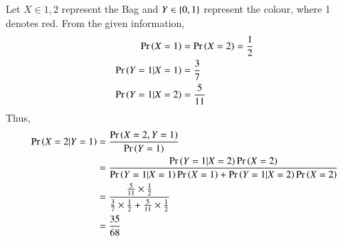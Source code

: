 Let $X \in {1,2}$ represent the Bag  and $Y \in \left\{0,1\right\}$ represent the colour, where 1 denotes red.  From the given information,
\begin{align}
\Pr\left(X=1\right)&=\Pr\left(X=2\right) = \frac{1}{2}
\\
\Pr\left(Y = 1|X=1\right) &= \frac{3}{7}
\\
\Pr\left(Y = 1|X=2\right) &= \frac{5}{11}
\end{align}
Thus,
{\tiny
\begin{align}
\Pr\left(X=2|Y=1\right) &= \frac{\Pr\left(X=2,Y=1\right)}{\Pr\left(Y=1\right)}
\\
&=\frac{\Pr\left(Y=1|X=2\right)\Pr\left(X=2\right)}{\Pr\left(Y=1|X=1\right)\Pr\left(X=1\right)+\Pr\left(Y=1|X=2\right)\Pr\left(X=2\right)}
\\
&=\frac{\frac{5}{11}\times \frac{1}{2}}{\frac{3}{7}\times \frac{1}{2}+\frac{5}{11}\times \frac{1}{2}}
\\
&=\frac{35}{68}
\end{align}
}
